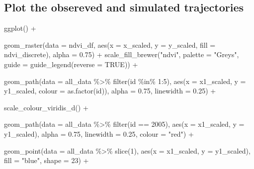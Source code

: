 \documentclass[
  letterpaper,
  DIV=11,
  numbers=noendperiod]{scrartcl}
\newenvironment{Shaded}{\begin{snugshade}}{\end{snugshade}}
\newcommand{\AttributeTok}[1]{\textcolor[rgb]{0.40,0.45,0.13}{#1}}
\newcommand{\ConstantTok}[1]{\textcolor[rgb]{0.56,0.35,0.01}{#1}}
\newcommand{\DecValTok}[1]{\textcolor[rgb]{0.68,0.00,0.00}{#1}}
\newcommand{\FloatTok}[1]{\textcolor[rgb]{0.68,0.00,0.00}{#1}}
\newcommand{\FunctionTok}[1]{\textcolor[rgb]{0.28,0.35,0.67}{#1}}
\newcommand{\NormalTok}[1]{\textcolor[rgb]{0.00,0.23,0.31}{#1}}
\newcommand{\SpecialCharTok}[1]{\textcolor[rgb]{0.37,0.37,0.37}{#1}}
\newcommand{\StringTok}[1]{\textcolor[rgb]{0.13,0.47,0.30}{#1}}
\begin{document}
\subsection{Plot the obsereved and simulated
trajectories}\label{plot-the-obsereved-and-simulated-trajectories}

\begin{Shaded}
\begin{Highlighting}[]
\FunctionTok{ggplot}\NormalTok{() }\SpecialCharTok{+}
  
  \FunctionTok{geom\_raster}\NormalTok{(}\AttributeTok{data =}\NormalTok{ ndvi\_df, }
                      \FunctionTok{aes}\NormalTok{(}\AttributeTok{x =}\NormalTok{ x\_scaled, }\AttributeTok{y =}\NormalTok{ y\_scaled, }\AttributeTok{fill =}\NormalTok{ ndvi\_discrete), }
                      \AttributeTok{alpha =} \FloatTok{0.75}\NormalTok{) }\SpecialCharTok{+}
  \FunctionTok{scale\_fill\_brewer}\NormalTok{(}\StringTok{"ndvi"}\NormalTok{, }\AttributeTok{palette =} \StringTok{"Greys"}\NormalTok{, }
                    \AttributeTok{guide =} \FunctionTok{guide\_legend}\NormalTok{(}\AttributeTok{reverse =} \ConstantTok{TRUE}\NormalTok{)) }\SpecialCharTok{+}
  
  \FunctionTok{geom\_path}\NormalTok{(}\AttributeTok{data =}\NormalTok{ all\_data }\SpecialCharTok{\%\textgreater{}\%} \FunctionTok{filter}\NormalTok{(id }\SpecialCharTok{\%in\%} \DecValTok{1}\SpecialCharTok{:}\DecValTok{5}\NormalTok{),}
            \FunctionTok{aes}\NormalTok{(}\AttributeTok{x =}\NormalTok{ x1\_scaled, }\AttributeTok{y =}\NormalTok{ y1\_scaled, }\AttributeTok{colour =} \FunctionTok{as.factor}\NormalTok{(id)), }
            \AttributeTok{alpha =} \FloatTok{0.75}\NormalTok{, }\AttributeTok{linewidth =} \FloatTok{0.25}\NormalTok{) }\SpecialCharTok{+}
  
  \FunctionTok{scale\_colour\_viridis\_d}\NormalTok{() }\SpecialCharTok{+}
  
  \FunctionTok{geom\_path}\NormalTok{(}\AttributeTok{data =}\NormalTok{ all\_data }\SpecialCharTok{\%\textgreater{}\%} \FunctionTok{filter}\NormalTok{(id }\SpecialCharTok{==} \DecValTok{2005}\NormalTok{),}
            \FunctionTok{aes}\NormalTok{(}\AttributeTok{x =}\NormalTok{ x1\_scaled, }\AttributeTok{y =}\NormalTok{ y1\_scaled), }
            \AttributeTok{alpha =} \FloatTok{0.75}\NormalTok{, }\AttributeTok{linewidth =} \FloatTok{0.25}\NormalTok{, }\AttributeTok{colour =} \StringTok{"red"}\NormalTok{) }\SpecialCharTok{+}
  
  \FunctionTok{geom\_point}\NormalTok{(}\AttributeTok{data =}\NormalTok{ all\_data }\SpecialCharTok{\%\textgreater{}\%} \FunctionTok{slice}\NormalTok{(}\DecValTok{1}\NormalTok{),}
            \FunctionTok{aes}\NormalTok{(}\AttributeTok{x =}\NormalTok{ x1\_scaled, }\AttributeTok{y =}\NormalTok{ y1\_scaled), }\AttributeTok{fill =} \StringTok{"blue"}\NormalTok{, }\AttributeTok{shape =} \DecValTok{23}\NormalTok{) }\SpecialCharTok{+}
  

\end{Highlighting}
\end{Shaded}
\end{document}
